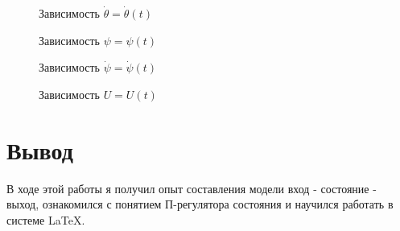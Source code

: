 \documentclass[a4paper]{article}
\begin{document}
\begin{flushleft}
\begin{figure} [H]
    \caption{Зависимость \(\dot{\theta} = \dot{\theta}(t)\)\ }
\end{figure}

\begin{figure} [H]
    \caption{Зависимость \(\psi = \psi(t)\)\ }
\end{figure}

\begin{figure} [H]
    \caption{Зависимость \(\dot{\psi} = \dot{\psi}(t)\)\ }
\end{figure}

\begin{figure} [H]
    \caption{Зависимость \(U = U(t)\)\ }
\end{figure}


\section{Вывод}
В ходе этой работы я получил опыт составления модели вход - состояние - выход, ознакомился с понятием П-регулятора состояния и научился работать в системе \LaTeX.
\end{flushleft} 
\end{document}

